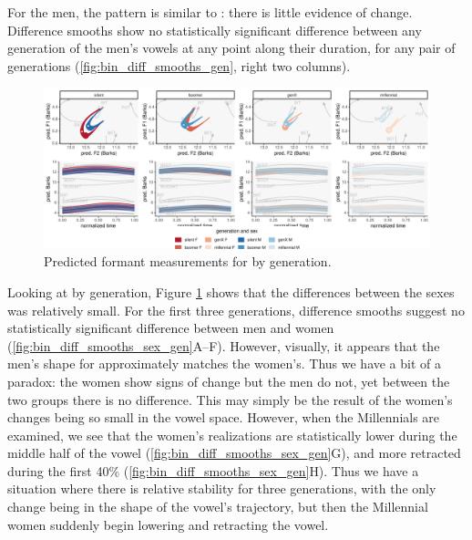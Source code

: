 For the men, the pattern is similar to \bit: there is little evidence of change. Difference smooths show no statistically significant difference between any generation of the men's vowels at any point along their duration, for any pair of generations (\ref{fig:bin_diff_smooths_gen}, right two columns).

\begin{figure}[p]
	\centering
	\includegraphics[angle = 90, origin = c, height = \textwidth]{Figures/BIN/BIN_sex_panel_plot_wide.pdf}
	\caption[Predicted formant measurements for \bin by generation.]{Predicted formant measurements for \bin by generation.}
	\label{fig:BIN_sex_panel_plot_wide}
\end{figure}

Looking at \bin by generation, Figure \ref{fig:BIN_sex_panel_plot_wide} shows that the differences between the sexes was relatively small. For the first three generations, difference smooths suggest no statistically significant difference between men and women (\ref{fig:bin_diff_smooths_sex_gen}A--F). However, visually, it appears that the men's shape for \bin approximately matches the women's. Thus we have a bit of a paradox: the women show signs of change but the men do not, yet between the two groups there is no difference. This may simply be the result of the women's changes being so small in the vowel space. However, when the Millennials are examined, we see that the women's realizations are statistically lower during the middle half of the vowel (\ref{fig:bin_diff_smooths_sex_gen}G), and more retracted during the first 40\% (\ref{fig:bin_diff_smooths_sex_gen}H). Thus we have a situation where there is relative stability for three generations, with the only change being in the shape of the vowel's trajectory, but then the Millennial women suddenly begin lowering and retracting the vowel.

